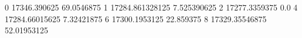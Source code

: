 0 17346.390625 69.0546875
1 17284.861328125 7.525390625
2 17277.3359375 0.0
4 17284.66015625 7.32421875
6 17300.1953125 22.859375
8 17329.35546875 52.01953125

